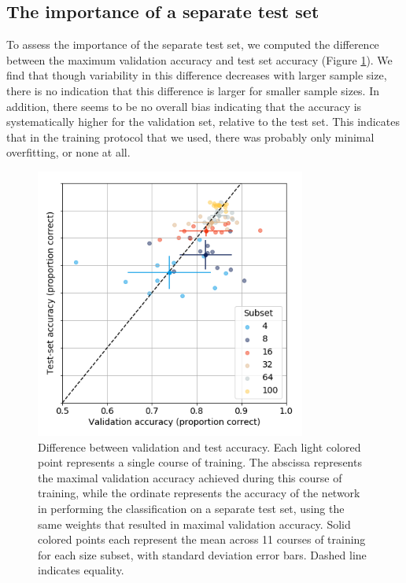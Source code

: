 \subsection{The importance of a separate test set}

To assess the importance of the separate test set, we computed the difference
between the maximum validation accuracy and test set accuracy (Figure
\ref{fig_diff}). We find that though variability in this difference decreases
with larger sample size, there is no indication that this difference is larger
for smaller sample sizes. In addition, there seems to be no overall bias
indicating that the accuracy is systematically higher for the validation set,
relative to the test set. This indicates that in the training protocol that we
used, there was probably only minimal overfitting, or none at all.

\begin{figure}[!t]
\centering
\includegraphics[width=3.5in]{./figures/diff}

\caption{Difference between validation and test accuracy. Each light colored
point represents a single course of training. The abscissa represents the
maximal validation accuracy achieved during this course of training, while the
ordinate represents the accuracy of the network in performing the classification
on a separate test set, using the same weights that resulted in maximal
validation accuracy. Solid colored points each represent the mean across 11
courses of training for each size subset, with standard deviation error bars. Dashed line indicates equality.}

\label{fig_diff}
\end{figure}
